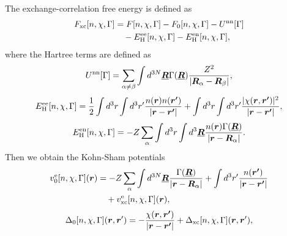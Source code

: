The exchange-correlation free energy is defined as
%
\begin{equation}%
\begin{split}
	\label{eq:Fxc-def}
	F_{\mathrm {xc}}[n, \chi, \Gamma] &= F[n, \chi, \Gamma] - F_0[n, \chi, \Gamma] - U^{\rm nn}[\Gamma] \\
							&\quad - E^{\rm ee}_{\rm H}[n, \chi, \Gamma] - E^{\rm en}_{\rm H}[n, \chi, \Gamma],
\end{split}
\end{equation}
%
where the Hartree terms are defined as
%
\begin{equation}%
	U^{\rm nn}[\Gamma] = \sum_{\alpha \neq \beta}\int d^{3N}\underline{\bm{R}}\Gamma({\underline{\bm{R}}})
						\frac{Z^2}{\left| \bm{R}_\alpha - \bm{R}_\beta \right|},
\end{equation}
%
\begin{equation}%
	\label{eq:anomHartree}
	E^{\rm ee}_{\rm H}[n, \chi, \Gamma] = \frac{1}{2}\int d^3r\int d^3r' \frac{n(\bm{r})n(\bm{r'})}{|\bm{r}-\bm{r'}|}
								+ \int d^3r\int d^3r' \frac{|\chi(\bm{r}, \bm{r'})|^2}{|\bm{r}-\bm{r'}|},
\end{equation}
%
\begin{equation}%
	E^{\rm en}_{\rm H}[n, \chi, \Gamma] = -Z\sum_{\alpha} \int d^3r \int d^3\underline{\bm{R}} 
								\frac{n(\bm{r})\Gamma(\underline{\bm{R}})}{|\bm{r}-\bm{R}_\alpha|}.
\end{equation}
%
Then we obtain the Kohn-Sham potentials 
%
\begin{equation} %
\begin{split}
	v^{\rm e}_0[n, \chi, \Gamma]({\bm r}) &= -Z\sum_{\alpha} \int d^{3N} \underline{\bm{R}}
									\frac{\Gamma(\underline{\bm{R}})}{|\bm{r}-\bm{R}_\alpha |} 
				+ \int d^3 r' \frac{n(\bm{r'})}{|\bm{r}-\bm{r'}|} \\
				& \quad + v^{\rm e}_{\rm xc}[n, \chi, \Gamma]({\bm r}),
\end{split}
\end{equation}
%
\begin{equation} %
\label{eq:Delta0}
\begin{split}
	\Delta_0[n, \chi, \Gamma]({\bm r}, {\bm r'}) = -\frac{\chi(\bm{r}, \bm{r'})}{|\bm{r}-\bm{r'}|}
									 + \Delta_{\rm xc}[n, \chi, \Gamma]({\bm r}, {\bm r'}),
\end{split}
\end{equation}
